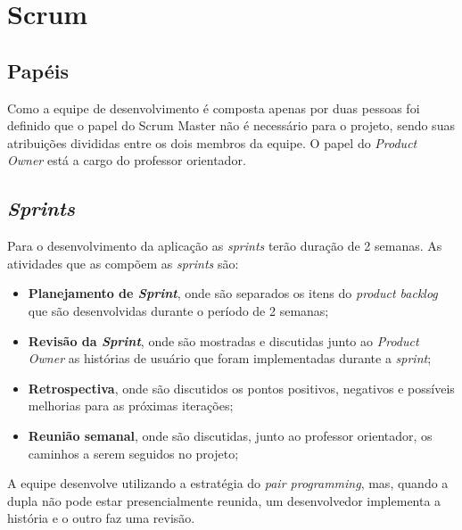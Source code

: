 \section{Scrum}

\subsection{Papéis}
Como a equipe de desenvolvimento é composta apenas por duas pessoas foi definido que o papel do Scrum Master não é necessário para o projeto, sendo suas atribuições divididas entre os dois membros da equipe. O papel do \textit{Product Owner} está a cargo do professor orientador.

\subsection{\textit{Sprints}}
Para o desenvolvimento da aplicação as \textit{sprints} terão duração de 2 semanas. As atividades que as compõem as \textit{sprints} são: 
\begin{itemize}
  \item \textbf{Planejamento de \textit{Sprint}}, onde são separados os itens do \textit{product backlog} que são desenvolvidas durante o período de 2 semanas;
  \item \textbf{Revisão da \textit{Sprint}}, onde são mostradas e discutidas junto ao \textit{Product Owner} as histórias de usuário que foram implementadas durante a \textit{sprint};
  \item \textbf{Retrospectiva}, onde são discutidos os pontos positivos, negativos e possíveis melhorias para as próximas iterações;
  \item \textbf{Reunião semanal}, onde são discutidas, junto ao professor orientador, os caminhos a serem seguidos no projeto;
\end{itemize}
A equipe desenvolve utilizando a estratégia do \textit{pair programming}, mas, quando a dupla não pode estar presencialmente reunida, um desenvolvedor implementa a história e o outro faz uma revisão.

